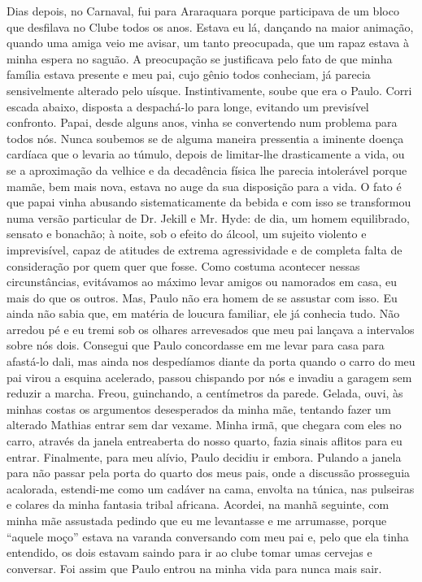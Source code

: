 Dias depois, no Carnaval, fui para Araraquara porque participava de um bloco que desfilava no Clube todos os anos.
Estava eu lá, dançando na maior animação, quando uma amiga veio me avisar, um tanto preocupada, que um rapaz estava à minha espera no saguão.
A preocupação se justificava pelo fato de que minha família estava presente e meu pai, cujo gênio todos conheciam, já parecia sensivelmente alterado pelo uísque.
 Instintivamente, soube que era o Paulo.
Corri escada abaixo, disposta a despachá-lo para longe, evitando um previsível confronto.
Papai, desde alguns anos, vinha se convertendo num problema para todos nós.
Nunca soubemos se de alguma maneira pressentia a iminente doença cardíaca que o levaria ao túmulo, depois de limitar-lhe drasticamente a vida, ou se a aproximação da velhice e da decadência física lhe parecia intolerável porque mamãe, bem mais nova, estava no auge da sua disposição para a vida.
O fato é que papai vinha abusando sistematicamente da bebida e com isso se transformou numa versão particular de Dr.
Jekill e Mr. Hyde: de dia, um homem equilibrado, sensato e bonachão; à noite, sob o efeito do álcool, um sujeito violento e imprevisível, capaz de atitudes de extrema agressividade e de completa falta de consideração por quem quer que fosse.
Como costuma acontecer nessas circunstâncias, evitávamos ao máximo levar amigos ou namorados em casa, eu mais do que os outros.
Mas, Paulo não era homem de se assustar com isso.
Eu ainda não sabia que, em matéria de loucura familiar, ele já conhecia tudo.
Não arredou pé e eu tremi sob os olhares arrevesados que meu pai lançava a intervalos sobre nós dois.
Consegui que Paulo concordasse em me levar para casa para afastá-lo dali, mas ainda nos despedíamos diante da porta quando o carro do meu pai virou a esquina acelerado, passou chispando por nós e invadiu a garagem sem reduzir a marcha.
Freou, guinchando, a centímetros da parede.
Gelada, ouvi, às minhas costas os argumentos desesperados da minha mãe, tentando fazer um alterado Mathias entrar sem dar vexame.
 Minha irmã, que chegara com eles no carro, através da janela entreaberta do nosso quarto, fazia sinais aflitos para eu entrar.
Finalmente, para meu alívio, Paulo decidiu ir embora.
Pulando a janela para não passar pela porta do quarto dos meus pais, onde a discussão prosseguia acalorada, estendi-me como um cadáver na cama, envolta na túnica, nas pulseiras e colares da minha fantasia tribal africana.
Acordei, na manhã seguinte, com minha mãe assustada pedindo que eu me levantasse e me arrumasse, porque ``aquele moço'' estava na varanda conversando com meu pai e, pelo que ela tinha entendido, os dois estavam saindo para ir ao clube tomar umas cervejas e conversar.
 Foi assim que Paulo entrou na minha vida para nunca mais sair.


